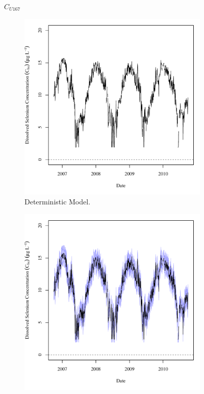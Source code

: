 \begin{linenumbers}
\subfiguremid
\begin{landscape}
	\begin{figure}
		$ C_{U167} $
		\begin{subfigure}{0.7\textwidth}
			\centering
			\includegraphics[width=\tableCustomSize]{"Figures/Results_USR/Deterministic/c TS RFD"}
			\caption{Deterministic Model.}
		\end{subfigure}%
		\begin{subfigure}{0.7\textwidth}
			\centering
			\includegraphics[width=\tableCustomSize]{"Figures/Results_USR/Stochastic/c TS RFD"}

\end{subfigure}
\end{figure}
\end{landscape}
\end{linenumbers}
